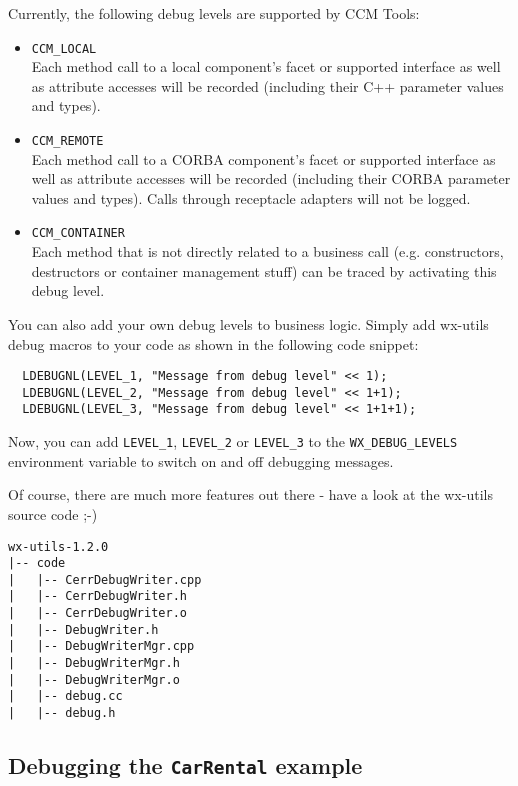 Currently, the following debug levels are supported by CCM Tools:
\begin{itemize}
\item {\tt CCM\_LOCAL} \\
Each method call to a local component's facet or supported interface
as well as attribute accesses will be recorded (including their C++ parameter
values and types).

\item {\tt CCM\_REMOTE} \\
Each method call to a CORBA component's facet or supported interface
as well as attribute accesses will be recorded (including their CORBA 
parameter values and types). Calls through receptacle adapters will not
be logged.

\item {\tt CCM\_CONTAINER} \\
Each method that is not directly related to a business call (e.g. constructors,
destructors or container management stuff) can be traced by activating this 
debug level.
\end{itemize}

You can also add your own debug levels to business logic. Simply add
wx-utils debug macros to your code as shown in the following code snippet:
\begin{verbatim}
  LDEBUGNL(LEVEL_1, "Message from debug level" << 1);
  LDEBUGNL(LEVEL_2, "Message from debug level" << 1+1);
  LDEBUGNL(LEVEL_3, "Message from debug level" << 1+1+1);
\end{verbatim}
Now, you can add {\tt LEVEL\_1}, {\tt LEVEL\_2} or {\tt LEVEL\_3} to the 
{\tt WX\_DEBUG\_LEVELS} environment variable to switch on and off debugging
messages.

Of course, there are much more features out there - have a look at the wx-utils
source code ;-)
\begin{verbatim}
wx-utils-1.2.0
|-- code
|   |-- CerrDebugWriter.cpp
|   |-- CerrDebugWriter.h
|   |-- CerrDebugWriter.o
|   |-- DebugWriter.h
|   |-- DebugWriterMgr.cpp
|   |-- DebugWriterMgr.h
|   |-- DebugWriterMgr.o
|   |-- debug.cc
|   |-- debug.h
\end{verbatim}



\newpage
\subsection{Debugging the {\tt CarRental} example}

